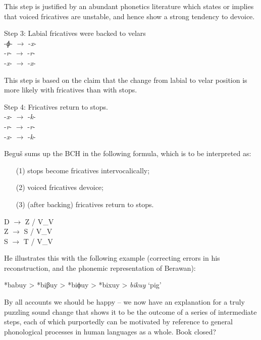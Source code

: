 \documentclass[output=paper]{langscibook}
\begin{document}
This step is justified by an abundant phonetics literature which states or implies that voiced fricatives are unstable, and hence show a strong tendency to devoice.

\ea
Step 3: Labial fricatives were backed to velars\\
-\textit{ɸ}-  $\to$  -\textit{x}-\\
-\textit{r}-  $\to$  -\textit{r}-\\
-\textit{x}-  $\to$  -\textit{x}-\\
\z

This step is based on the claim that the change from labial to velar position is more likely with fricatives than with stops.

\ea
Step 4: Fricatives return to stops.\\
-\textit{x}-  $\to$  -\textit{k}-\\
-\textit{r}-  $\to$  -\textit{r}-\\
-\textit{x}-  $\to$  -\textit{k}-\\
\z

Beguš sums up the BCH in the following formula, which is to be interpreted as: 
\begin{enumerate} 
\item[(1)] stops become fricatives intervocalically; 
\item[(2)] voiced fricatives devoice;
\item[(3)] (after backing) fricatives return to stops.
\end{enumerate}

\ea
D $\to$ Z / V\_V \\
Z $\to$ S / V\_V \\
S $\to$ T / V\_V \\
\z

He illustrates this with the following example (correcting errors in his reconstruction, and the phonemic representation of Berawan):

\ea
*babuy > *biβuy > *biϕuy > *bixuy > \textit{bikuy} ‘pig’
\z

By all accounts we should be happy -- we now have an explanation for a truly puzzling sound change that shows it to be the outcome of a series of intermediate steps, each of which purportedly can be motivated by reference to general phonological processes in human languages as a whole. Book closed?
\end{document}
